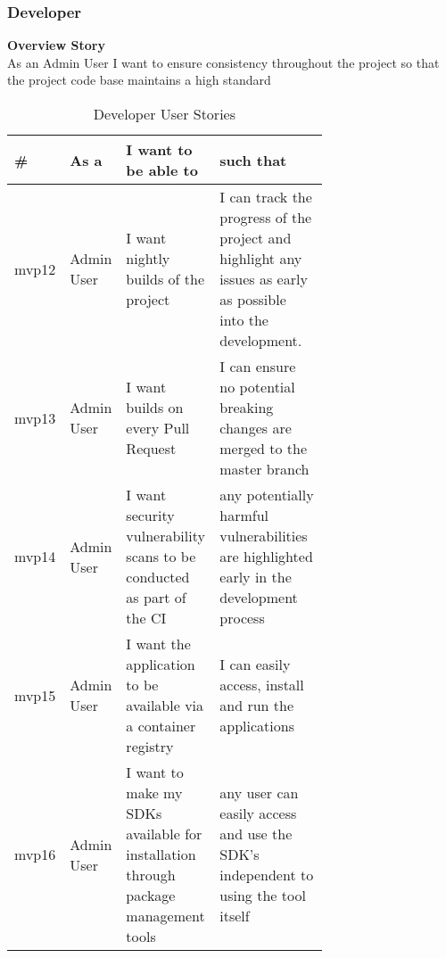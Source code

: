 \documentclass{article}
\begin{document}
\subsubsection{Developer}
\textbf{Overview Story}
\\As an Admin User I want to ensure consistency throughout the project so that the project code base maintains a high standard
\begin{table}[!ht]
\begin{tabular}{|l|l|p{0.3\linewidth}|p{0.4\linewidth}|}
\hline
\textbf{\#} & \textbf{As a} & \textbf{I want to be able to}                                                      & \textbf{such that}                                                                                          \\ \hline
mvp12       & Admin User    & I want nightly builds of the project                                               & I can track the progress of the project and highlight any issues as early as possible into the development. \\ \hline
mvp13       & Admin User    & I want builds on every Pull Request                                                & I can ensure no potential breaking changes are merged to the master branch                                  \\ \hline
mvp14       & Admin User    & I want security vulnerability scans to be conducted as part of the CI              & any potentially harmful vulnerabilities are highlighted early in the development process                    \\ \hline
mvp15       & Admin User    & I want the application to be available via a container registry                    & I can easily access, install and run the applications                                                       \\ \hline
mvp16       & Admin User    & I want to make my SDKs available for installation through package management tools & any user can easily access and use the SDK's independent to using the tool itself                           \\ \hline
\end{tabular}
\caption{Developer User Stories}
\label{tab:dev}
\end{table}

\newpage
\end{document}
